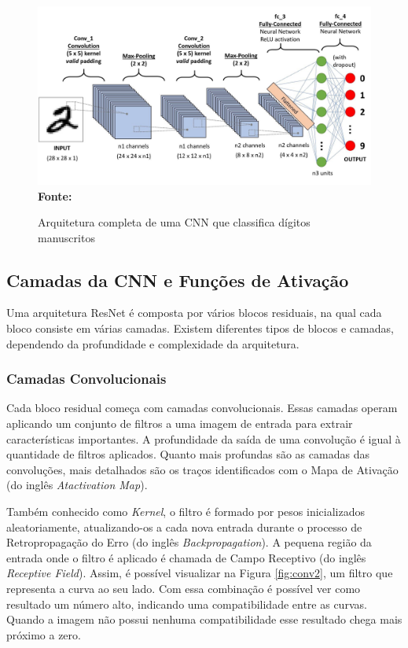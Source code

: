 \begin{figure}[ht]
 	\centering	
 	\caption[\hspace{0.1cm}Grade Computacional.]{Arquitetura completa de uma CNN que classifica dígitos manuscritos}
 	\vspace{-0.4cm}
 	\includegraphics[width=1\textwidth]{figuras/cnn.png}
 	\captionsetup{justification=centering}
	\vspace{-0.2cm}
     \\\textbf{\footnotesize Fonte: \cite{towardsdatascienceimage}}
	\label{fig:cnn}
\end{figure}

\subsection{\esp Camadas da CNN e Funções de Ativação} \label{camadasfund}

Uma arquitetura ResNet é composta por vários blocos residuais, na qual cada bloco consiste em várias camadas. Existem diferentes tipos de blocos e camadas, dependendo da profundidade e complexidade da arquitetura.

\subsubsection{\esp Camadas Convolucionais} \label{convs}

Cada bloco residual começa com camadas convolucionais. Essas camadas operam aplicando um conjunto de filtros a uma imagem de entrada para extrair características importantes. A profundidade da saída de uma convolução é igual à quantidade de filtros aplicados. Quanto mais profundas são as camadas das convoluções, mais detalhados são os traços identificados com o Mapa de Ativação (do inglês \textit{Atactivation Map}). 

Também conhecido como \textit{Kernel}, o filtro é formado por pesos inicializados aleatoriamente, atualizando-os a cada nova entrada durante o processo de Retropropagação do Erro (do inglês \textit{Backpropagation}). A pequena região da entrada onde o filtro é aplicado é chamada de Campo Receptivo (do inglês \textit{Receptive Field}). Assim, é possível visualizar na Figura \ref{fig:conv2}, um filtro que representa a curva ao seu lado. Com essa combinação é possível ver como resultado um número alto, indicando uma compatibilidade entre as curvas. Quando a imagem não possui nenhuma compatibilidade esse resultado chega mais próximo a zero.

